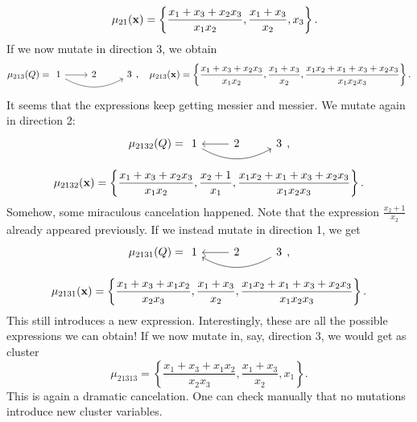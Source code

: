 \begin{example}
\begin{equation*}
		\quad \mu_{21}(\mathbf{x}) = \left\{\frac{x_1 + x_3 + x_2x_3}{x_1x_2}, \frac{x_1 + x_3}{x_2}, x_3\right\}.
	\end{equation*}
	If we now mutate in direction 3, we obtain
	\begin{equation*}
		\mu_{213}(Q) =
		\begin{tikzcd}
			1 \rar[] \ar[rr, bend right] & 2 & 3
		\end{tikzcd},
		\quad \mu_{213}(\bx) = \left\{\frac{x_1 + x_3 + x_2x_3}{x_1x_2}, \frac{x_1 + x_3}{x_2}, \frac{x_1 x_2 + x_1 + x_3 + x_2 x_3}{x_1x_2x_3}\right\}.
	\end{equation*}
	It seems that the expressions keep getting messier and messier. We mutate again in direction 2:
	\begin{equation*}
		\mu_{2132}(Q) =
		\begin{tikzcd}
			1 \rar[leftarrow] \ar[rr, bend right] & 2 & 3
		\end{tikzcd},
	\end{equation*}
	\begin{equation*}
		\mu_{2132}(\mathbf{x})= \left\{\frac{x_1 + x_3 + x_2x_3}{x_1x_2}, \frac{x_2 + 1}{x_1}, \frac{x_1 x_2 + x_1 + x_3 + x_2 x_3}{x_1x_2x_3}\right\}.
	\end{equation*}
	Somehow, some miraculous cancelation happened.
	Note that the expression $\frac{x_2 + 1}{x_2}$ already appeared previously.
	If we instead mutate in direction 1, we get
	\begin{equation*}
		\mu_{2131}(Q) =
		\begin{tikzcd}
			1 \rar[leftarrow] \ar[rr,leftarrow, bend right] & 2 & 3
		\end{tikzcd},
	\end{equation*}
	\begin{equation*}
		\mu_{2131}(\mathbf{x}) = \left\{\frac{x_1 + x_3 + x_1x_2}{x_2x_3}, \frac{x_1 + x_3}{x_2}, \frac{x_1 x_2 + x_1 + x_3 + x_2 x_3}{x_1x_2x_3}\right\}.
	\end{equation*}
	This still introduces a new expression.
	Interestingly, these are all the possible expressions we can obtain!
	If we now mutate in, say, direction 3, we would get as cluster
	\begin{equation*}
		\mu_{21313} = \left\{\frac{x_1 + x_3 + x_1x_2}{x_2x_3}, \frac{x_1 + x_3}{x_2}, x_1 \right\}.
	\end{equation*}
	This is again a dramatic cancelation. One can check manually
	that no mutations introduce new cluster variables.
\end{example}

